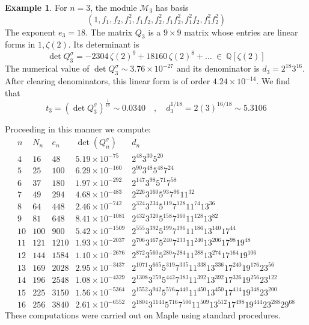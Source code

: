 \documentclass[a4paper,10pt]{amsart}
\theoremstyle{definition}
\newtheorem{example}[thm]{Example}
\theoremstyle{remark}
\numberwithin{equation}{section}
\newcommand{\Q}{\mathbb Q}
\newcommand{\0}{\color{blue}{\mathsf{0}}}
\begin{document}
  
 \begin{example}
 For $n=3$, the module $\mathcal{M}_3$ has basis 
\[ (1,f_1,f_2,f_1^2,f_1f_2, f_2^2, f_1f_2^2,f_1^2f_2,f_1^2f_2^2)\]
The exponent $e_3 = 18$. The matrix $Q_3$ is a  $9 \times 9$ matrix whose entries are linear forms in $1, \zeta(2)$. Its determinant is 
\[\det Q^{\sigma}_3 = -2304 \, \zeta(2)^9 + 18160\,  \zeta(2)^8 + \ldots \ \in\  \Q[\zeta(2)]\] 
The numerical value of $\det Q^{\sigma}_3  \sim 3.76 \times 10^{-27}$ and its denominator is $d_3 = 2^{18} 3^{16}$.  After clearing denominators, this linear form is of order $4.24 \times 10^{-14}$. We find that 
\[  t_3= (\det Q^{\sigma}_3)^{\frac{1}{18}} \sim  0.0340 \quad , \quad    d_3^{1/18}= 2 (3)^{16/18} \sim   5.3106\]
  \end{example} 
         Proceeding in this manner we compute: 
 \[ 
\begin{array}{c|cccc}
n  &N_n&  e_n & \det(Q^{\sigma}_n) & d_n   \\ \hline
 4 &    16  &  48 &   5.19 \times 10^{-75} &  2^{48} 3^{30}5^{20} \\
   5 &  25  & 100  &   6.29 \times 10^{-160} &  2^{90} 3^{48} 5^{48} 7^{24}\\
  6 &   37 &180  &  1.97 \times 10^{-292}  &  2^{147} 3^{98} 5^{71} 7^{58}  \\
  7 &   49 &294  &  4.68 \times 10^{-483}  &  2^{226} 3^{160} 5^{93} 7^{96} 11^{32}  \\
  8 &   64 &448  &   2.46 \times 10^{-742}  & 2^{324} 3^{234} 5^{119} 7^{128} 11^{74} 13^{36} \\
  9 &   81& 648   &  8.41 \times 10^{-1081}  &  2^{432} 3^{320} 5^{158} 7^{160} 11^{128} 13^{82} \\
  10 &  100 &  900     &        5.42 \times 10^{-1509}                         &    2^{555} 3^{392} 5^{199} 7^{196} 11^{186} 13^{140} 17^{44} \\
  11  &  121 & 1210     &    1.93      \times 10^{-2037}                        &    2^{706} 3^{467} 5^{240} 7^{233} 11^{240} 13^{206} 17^{98} 19^{48}  \\
  12 &  144 & 1584     &        1.10  \times 10^{-2676} &    2^{872} 3^{560} 5^{280} 7^{284} 11^{288} 13^{274} 17^{164} 19^{106}  \\
  13 & 169 & 2028 & 2.95\times 10^{-3437} &    2^{1071} 3^{665} 5^{319} 7^{335} 11^{338} 13^{336} 17^{240} 19^{176} 23^{56}  \\
  14 & 196  & 2548 &  1.08 \times 10^{-4329} &  2^{1308} 3^{759} 5^{442} 7^{383} 11^{392} 13^{392} 17^{326} 19^{256} 23^{122} \\
  15 &  225  &   3150    &     1.56 \times 10^{-5364}  &     2^{1552} 3^{942} 5^{576} 7^{440} 11^{450} 13^{450} 17^{414}  19^{348}  23^{200} \\
  16 &  256 &  3840   &  2.61 \times 10^{-6552} &  2^{1804} 3^{1144} 5^{716} 7^{506} 11^{509} 13^{512} 17^{498} 19^{444} 23^{288} 29^{68}
\end{array}
\]
These computations were carried out on Maple using standard procedures.
\end{document}
